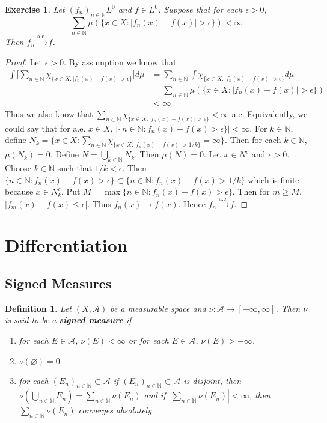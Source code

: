 \documentclass[12pt]{amsart}
\newtheorem{defn}[thm]{Definition}
\newtheorem{ex}[thm]{Exercise}
\newcommand{\ep}{\epsilon}
\newcommand{\N}{\mathbb{N}}
\newcommand{\MA}{\mathcal{A}}
\newcommand{\convt}[1]{\xrightarrow{\text{#1}}}
\begin{document}
	
	\begin{ex}
		Let $(f_n)_{n \in \N} L^0$ and $f \in L^0$. Suppose that for each $\ep >0$, $$\sum_{n \in \N}\mu(\{x \in X: |f_n(x)-f(x)| > \ep\}) < \infty$$
		Then $f_n \convt{a.e.} f$.
	\end{ex}
	
	\begin{proof}
		Let $\ep>0$. By assumption we know that
		\begin{align*}
			\int \bigg[ \sum_{n \in \N}\chi_{\{x \in X: |f_n(x)-f(x)| > \ep\}}\bigg] d \mu 
			&= \sum_{n \in \N}\int \chi_{\{x \in X: |f_n(x)-f(x)| > \ep\}}d \mu\\
			&=\sum_{n \in \N}\mu(\{x \in X: |f_n(x)-f(x)| > \ep\})\\
			& < \infty
		\end{align*}
		Thus we also know that $\sum_{n \in \N}\chi_{\{x \in X: |f_n(x)-f(x)| > \ep\}} < \infty$ a.e. Equivalently, we could say that for a.e. $x \in X$, $|\{n \in \N: f_n(x) - f(x) > \ep\}| < \infty$. For $k \in \N$, define $N_k = \{x \in X: \sum_{n \in \N}\chi_{\{x \in X: |f_n(x)-f(x)| > 1/k\}} = \infty\}$. Then for each $k \in \N$, $\mu(N_k) = 0$. Define $N = \bigcup_{k \in \N} N_k$. Then $\mu(N) = 0$. Let $x \in N^c$ and $\ep > 0$. Choose $k \in \N$ such that $1/k < \ep$. Then $\{n \in \N: f_n(x) - f(x) > \ep\} \subset \{n \in \N: f_n(x) - f(x) > 1/k\}$ which is finite because $x \in N_k^c$. Put $M = \max\{n \in \N: f_n(x) - f(x) > \ep\}$. Then for $m \geq M$, $|f_m(x) - f(x) \leq \ep|$. Thus $f_n(x) \rightarrow f(x)$. Hence $f_n \convt{a.e.} f$.
	\end{proof}
	
	\section{Differentiation}
	
	\subsection{Signed Measures}
	
	\begin{defn}
		Let $(X, \MA)$ be a measurable space and $\nu : \MA \rightarrow [-\infty, \infty]$. Then $\nu$ is said to be a \textbf{signed measure} if 
		\begin{enumerate}
			\item for each $E \in \MA$, $\nu(E) < \infty$ or for each $E \in \MA$, $\nu(E) > -\infty$.
			\item $\nu(\varnothing) = 0$
			\item for each $(E_n)_{n \in \N} \subset \MA$ if $(E_n)_{n \in \N} \subset \MA$ is disjoint, then $\nu(\bigcup\limits_{n \in \N} E_n) = \sum\limits_{n \in \N} \nu(E_n)$ and if $|\sum\limits_{n \in \N} \nu(E_n)| < \infty$, then $\sum\limits_{n \in \N} \nu(E_n)$ converges absolutely.
		\end{enumerate}
	\end{defn}
	
\end{document}
